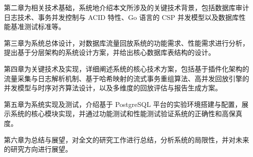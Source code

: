 第二章为相关技术基础，系统地介绍本文所涉及的关键技术背景，包括数据库审计日志技术、事务并发控制与 ACID 特性、Go 语言的 CSP 并发模型以及数据库性能基准测试标准等。

第三章为系统总体设计，对数据库流量回放系统的功能需求、性能需求进行分析，提出基于分层架构的系统设计方案，并给出核心数据库表结构的设计。

第四章为关键技术及实现，详细阐述系统的核心技术方案，包括基于插件化架构的流量采集与日志解析机制、基于哈希映射的流式事务重组算法、高并发回放引擎的并发模型与时序对齐算法设计，以及多维度的回放评估与报告生成方案。

第五章为系统实现及测试，介绍基于 PostgreSQL 平台的实验环境搭建与配置，展示系统的核心模块实现，并通过功能测试和性能测试验证系统的正确性和高保真度。

第六章为总结与展望，对全文的研究工作进行总结，分析系统的局限性，并对未来的研究方向进行展望。
